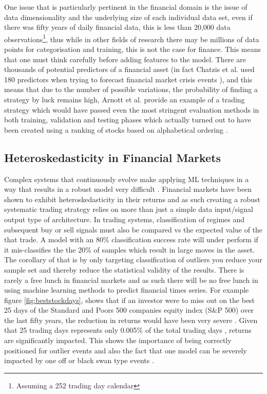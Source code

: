 \documentclass[11pt, a4paper]{article}
\begin{document}
One issue that is particularly pertinent in the financial domain is the issue of data dimensionality and the underlying size of each individual data set, even if there was fifty years of daily financial data, this is less than 20,000 data observations\footnote{Assuming a 252 trading day calendar}, thus while in other fields of research there may be millions of data points for categorisation and training, this is not the case for finance. This means that one must think carefully before adding features to the model. There are thousands of potential predictors of a financial asset (in fact Chatzis et al. used 180 predictors when trying to forecast financial market crisis events \cite{Chatzis2018} ), and this means that due to the number of possible variations, the probability of finding a strategy by luck remains high, Arnott et al. provide an example of a trading strategy which would have passed even the most stringent evaluation methods in both training, validation and testing phases which actually turned out to have been created using a ranking of stocks based on alphabetical ordering \cite{Arnott2018}.

\subsection{Heteroskedasticity in Financial Markets}

Complex systems that continuously evolve make applying ML techniques in a way that results in a robust model very difficult \cite{Arnott2018}. Financial markets have been shown to exhibit heteroskedasticity in their returns \cite{Corhay1996} and as such creating a robust systematic trading strategy relies on more than just a simple data input/signal output type of architecture. \newline In trading systems, classification of regimes and subsequent buy or sell signals must also be compared vs the expected value of the that trade. A model with an 80\% classification success rate will under perform if it mis-classifies the the 20\% of samples which result in large moves in the asset. The corollary of that is by only targeting classification of outliers you reduce your sample set and thereby reduce the statistical validity of the results. There is rarely a free lunch in financial markets and as such there will be no free lunch in using machine learning methods to predict financial times series. 
For example figure \ref{fig:beststockdays}, shows that if an investor were to miss out on the best 25 days of the Standard and Poors 500 companies equity index (S\&P 500) over the last fifty years, the reduction in returns would have been very severe \cite{bestdays}. Given that 25 trading days represents only 0.005\% of the total trading days , returns are significantly impacted. This shows the importance of being correctly positioned for outlier events and also the fact that one model can be severely impacted by one off or black swan type events \cite{Taleb2007}.
 
\end{document}

